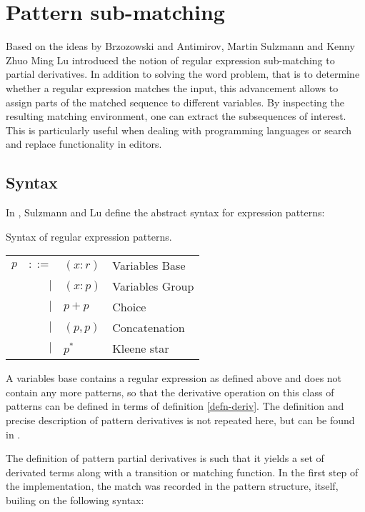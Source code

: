 \section{Pattern sub-matching}

Based on the ideas by Brzozowski and Antimirov, Martin Sulzmann and Kenny Zhuo
Ming Lu introduced the notion of regular expression sub-matching to partial
derivatives. In addition to solving the word problem, that is to determine
whether a regular expression matches the input, this advancement allows to
assign parts of the matched sequence to different variables. By inspecting the
resulting matching environment, one can extract the subsequences of interest.
This is particularly useful when dealing with programming languages or search
and replace functionality in editors.

\subsection{Syntax}

In \cite{pdpat}, Sulzmann and Lu define the abstract syntax for expression
patterns:

\begin{defn}
   \label{defn-pat}
   Syntax of regular expression patterns.

   \begin{tabular}{lrll}
      $p$	& $::=$	& $(x:r)$	& Variables Base	\\
		& $|$	& $(x:p)$	& Variables Group	\\
		& $|$	& $p+p$		& Choice		\\
		& $|$	& $(p,p)$	& Concatenation		\\
		& $|$	& $p^*$		& Kleene star		\\
   \end{tabular}
\end{defn}

A variables base contains a regular expression as defined above and does not
contain any more patterns, so that the derivative operation on this class of
patterns can be defined in terms of definition \ref{defn-deriv}. The definition
and precise description of pattern derivatives is not repeated here, but can be
found in \cite{pdpat}.

The definition of pattern partial derivatives is such that it yields a set of
derivated terms along with a transition or matching function. In the first step
of the implementation, the match was recorded in the pattern structure, itself,
builing on the following syntax:

